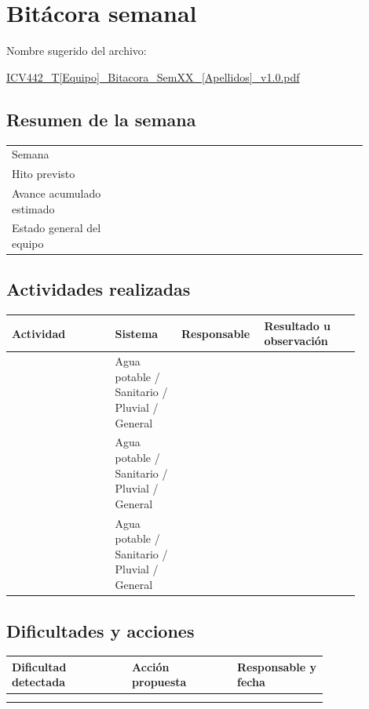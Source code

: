 \documentclass[11pt]{article}
\begin{document}
\section{Bit\'acora semanal}
\begin{infobox}
Nombre sugerido del archivo:

\url{ICV442_T[Equipo]_Bitacora_SemXX_[Apellidos]_v1.0.pdf}
\end{infobox}

\subsection*{Resumen de la semana}
\begin{tabular}{p{0.32\linewidth} p{0.58\linewidth}}
\toprule
Semana & \\
Hito previsto & \\
Avance acumulado estimado & \\
Estado general del equipo & \\
\bottomrule
\end{tabular}

\subsection*{Actividades realizadas}
\begin{tabular}{p{0.28\linewidth} p{0.18\linewidth} p{0.16\linewidth} p{0.26\linewidth}}
\toprule
Actividad & Sistema & Responsable & Resultado u observaci\'on \\
\midrule
 & Agua potable / Sanitario / Pluvial / General & & \\
 & Agua potable / Sanitario / Pluvial / General & & \\
 & Agua potable / Sanitario / Pluvial / General & & \\
\bottomrule
\end{tabular}

\subsection*{Dificultades y acciones}
\begin{tabular}{p{0.32\linewidth} p{0.28\linewidth} p{0.20\linewidth}}
\toprule
Dificultad detectada & Acci\'on propuesta & Responsable y fecha \\
\midrule
 & & \\
 & & \\
\bottomrule
\end{tabular}
\end{document}
